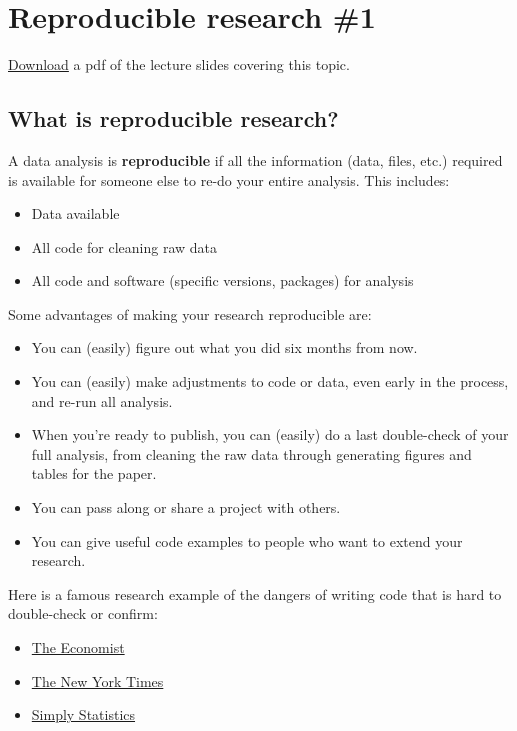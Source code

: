 \documentclass[]{book}
\providecommand{\tightlist}{%
  \setlength{\itemsep}{0pt}\setlength{\parskip}{0pt}}
\theoremstyle{definition}
\theoremstyle{definition}
\theoremstyle{definition}
\theoremstyle{remark}
\begin{document}
\chapter{Reproducible research \#1}\label{reproducible-research-1}

\href{https://github.com/geanders/RProgrammingForResearch/raw/master/slides/CourseNotes_Week5.pdf}{Download}
a pdf of the lecture slides covering this topic.

\section{What is reproducible
research?}\label{what-is-reproducible-research}

A data analysis is \textbf{reproducible} if all the information (data,
files, etc.) required is available for someone else to re-do your entire
analysis. This includes:

\begin{itemize}
\tightlist
\item
  Data available
\item
  All code for cleaning raw data
\item
  All code and software (specific versions, packages) for analysis
\end{itemize}

Some advantages of making your research reproducible are:

\begin{itemize}
\tightlist
\item
  You can (easily) figure out what you did six months from now.
\item
  You can (easily) make adjustments to code or data, even early in the
  process, and re-run all analysis.
\item
  When you're ready to publish, you can (easily) do a last double-check
  of your full analysis, from cleaning the raw data through generating
  figures and tables for the paper.
\item
  You can pass along or share a project with others.
\item
  You can give useful code examples to people who want to extend your
  research.
\end{itemize}

Here is a famous research example of the dangers of writing code that is
hard to double-check or confirm:

\begin{itemize}
\tightlist
\item
  \href{http://www.economist.com/node/21528593}{The Economist}
\item
  \href{http://www.nytimes.com/2011/07/08/health/research/08genes.html?_r=0}{The
  New York Times}
\item
  \href{http://simplystatistics.org/2012/02/27/the-duke-saga-starter-set/}{Simply
  Statistics}
\end{itemize}
\end{document}
